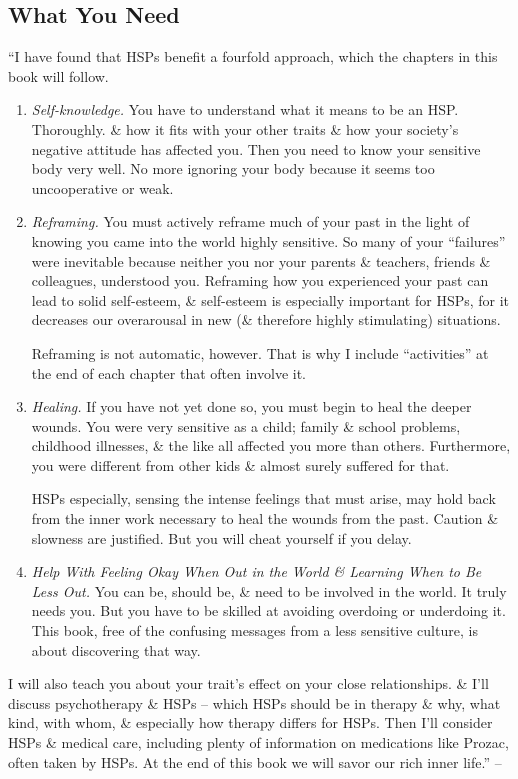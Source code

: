 \documentclass{article}
\numberwithin{equation}{section}
\begin{document}
\subsection*{What You Need}
``I have found that HSPs benefit a fourfold approach, which the chapters in this book will follow.
\begin{enumerate}
	\item \textit{Self-knowledge.} You have to understand what it means to be an HSP. Thoroughly. \& how it fits with your other traits \& how your society's negative attitude has affected you. Then you need to know your sensitive body very well. No more ignoring your body because it seems too uncooperative or weak.
	\item \textit{Reframing.} You must actively reframe much of your past in the light of knowing you came into the world highly sensitive. So many of your ``failures'' were inevitable because neither you nor your parents \& teachers, friends \& colleagues, understood you. Reframing how you experienced your past can lead to solid self-esteem, \& self-esteem is especially important for HSPs, for it decreases our overarousal in new (\& therefore highly stimulating) situations.
	
	Reframing is not automatic, however. That is why I include ``activities'' at the end of each chapter that often involve it.
	\item \textit{Healing.} If you have not yet done so, you must begin to heal the deeper wounds. You were very sensitive as a child; family \& school problems, childhood illnesses, \& the like all affected you more than others. Furthermore, you were different from other kids \& almost surely suffered for that.
	
	HSPs especially, sensing the intense feelings that must arise, may hold back from the inner work necessary to heal the wounds from the past. Caution \& slowness are justified. But you will cheat yourself if you delay.
	\item \textit{Help With Feeling Okay When Out in the World \& Learning When to Be Less Out.} You can be, should be, \& need to be involved in the world. It truly needs you. But you have to be skilled at avoiding overdoing or underdoing it. This book, free of the confusing messages from a less sensitive culture, is about discovering that way.
\end{enumerate}
I will also teach you about your trait's effect on your close relationships. \& I'll discuss psychotherapy \& HSPs -- which HSPs should be in therapy \& why, what kind, with whom, \& especially how therapy differs for HSPs. Then I'll consider HSPs \& medical care, including plenty of information on medications like Prozac, often taken by HSPs. At the end of this book we will savor our rich inner life.'' -- \cite[pp. 30--31]{Aron2013}
\end{document}
